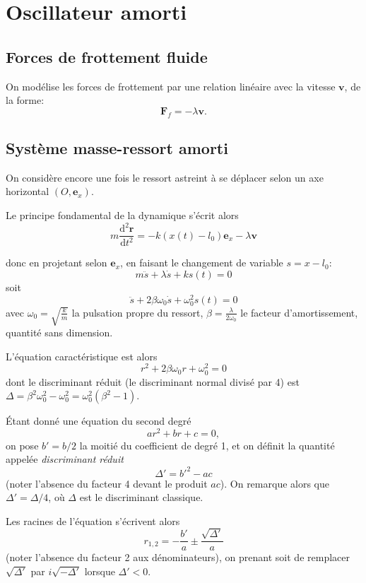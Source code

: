 \documentclass{article}
\renewcommand{\vec}[1]{\boldsymbol{\mathbf{#1}}}
\theoremstyle{definition}
\newcommand{\od}[3][]{\frac{\mathrm d^{#1}#2}{\mathrm d#3^{#1}}}
\begin{document}
\section{Oscillateur amorti}

\subsection{Forces de frottement fluide}

On modélise les forces de frottement par une relation linéaire avec la vitesse $\vec{v}$, de la forme:
\[\vec F_f = -\lambda \vec{v}.\]

\subsection{Système masse-ressort amorti}

On considère encore une fois le ressort astreint à se déplacer selon un axe horizontal $(O,\vec{e}_x)$.

Le principe fondamental de la dynamique s'écrit alors
\begin{equation}
m\od[2]{\vec{r}}{t} = -k(x(t)-l_0)\vec{e}_x - \lambda\vec{v}
\end{equation}

donc en projetant selon $\vec e_x$, en faisant le changement de variable $s = x-l_0$:
\begin{equation}
m\ddot{s} + \lambda\dot{s} + ks(t) = 0
\end{equation}
soit
\begin{equation}
\ddot{s} + 2\beta\omega_0\dot{s} + \omega_0^2s(t) = 0
\end{equation}
avec $\omega_0 = \sqrt{\frac{k}{m}}$ la pulsation propre du ressort, $\beta = \frac{\lambda}{2\omega_0}$ le facteur d'amortissement, quantité sans dimension.

L'équation caractéristique est alors
\begin{equation}
r^2 + 2\beta\omega_0r + \omega_0^2 = 0
\end{equation}
dont le discriminant réduit (le discriminant normal divisé par 4) est $\Delta = \beta^2\omega_0^2 - \omega_0^2 = \omega_0^2(\beta^2-1)$.

\begin{rap}
	Étant donné une équation du second degré
	\[
	ar^2 + br + c = 0,
	\]
	on pose $b' = b/2$ la moitié du coefficient de degré 1, et on définit la quantité appelée \textit{discriminant réduit}
	\[
	\Delta' = b'^2 - ac
	\]
	(noter l'absence du facteur 4 devant le produit $ac$). On remarque alors que $\Delta'=\Delta/4$, où $\Delta$ est le discriminant classique.
	
	Les racines de l'équation s'écrivent alors
	\[
	r_{1,2} = -\frac{b'}{a} \pm \frac{\sqrt{\Delta'}}{a}
	\]
	(noter l'absence du facteur 2 aux dénominateurs), on prenant soit de remplacer $\sqrt{\Delta'}$ par $i\sqrt{-\Delta'}$ lorsque $\Delta' < 0$.
\end{rap}
\end{document}

